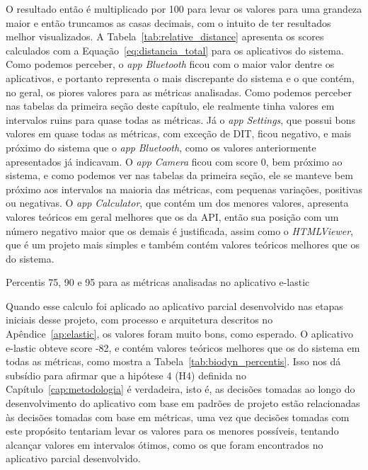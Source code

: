 O resultado então é multiplicado por 100 para levar os valores para uma grandeza maior e então truncamos as casas decimais, com o intuito de ter resultados melhor visualizados. A Tabela~\ref{tab:relative_distance} apresenta os scores calculados com a Equação~\ref{eq:distancia_total} para os aplicativos do sistema. Como podemos perceber, o \textit{app} \textit{Bluetooth} ficou com o maior valor dentre os aplicativos, e portanto representa o mais discrepante do sistema e o que contém, no geral, os piores valores para as métricas analisadas. Como podemos perceber nas tabelas da primeira seção deste capítulo, ele realmente tinha valores em intervalos ruins para quase todas as métricas. Já o \textit{app} \textit{Settings}, que possui bons valores em quase todas as métricas, com exceção de DIT, ficou negativo, e mais próximo do sistema que o \textit{app} \textit{Bluetooth}, como os valores anteriormente apresentados já indicavam. O \textit{app} \textit{Camera} ficou com score 0, bem próximo ao sistema, e como podemos ver nas tabelas da primeira seção, ele se manteve bem próximo aos intervalos na maioria das métricas, com pequenas variações, positivas ou negativas. O \textit{app} \textit{Calculator}, que contém um dos menores valores, apresenta valores teóricos em geral melhores que os da API, então sua posição com um número negativo maior que os demais é justificada, assim como o \textit{HTMLViewer}, que é um projeto mais simples e também contém valores teóricos melhores que os do sistema.

\begin{table}[!htb]
\centering
{}

\caption{Percentis 75, 90 e 95 para as métricas analisadas no aplicativo e-lastic}
\label{tab:biodyn_percentis}
\end{table}

Quando esse calculo foi aplicado ao aplicativo parcial desenvolvido nas etapas iniciais desse projeto, com processo e arquitetura descritos no Apêndice~\ref{ap:elastic}, os valores foram muito bons, como esperado. O aplicativo e-lastic obteve score -82, e contém valores teóricos melhores que os do sistema em todas as métricas, como mostra a Tabela~\ref{tab:biodyn_percentis}. Isso nos dá subsídio para afirmar que a hipótese 4 (H4) definida no Capítulo~\ref{cap:metodologia} é verdadeira, isto é, as decisões tomadas ao longo do desenvolvimento do aplicativo com base em padrões de projeto estão relacionadas às decisões tomadas com base em métricas, uma vez que decisões tomadas com este propósito tentariam levar os valores para os menores possíveis, tentando alcançar valores em intervalos ótimos, como os que foram encontrados no aplicativo parcial desenvolvido.


